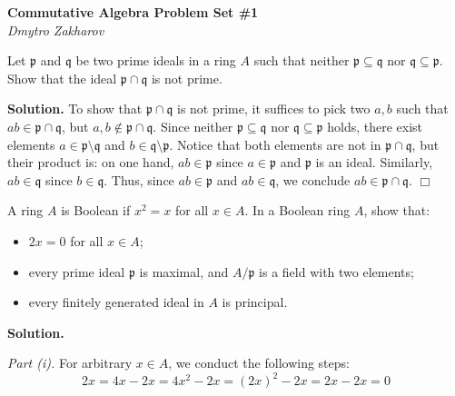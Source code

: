 \documentclass{template}
\newcommand{\qedwhite}{\hfill \ensuremath{\Box}}
\begin{document}
\begin{center}
    \Large \textcolor{blue!70!black}{\textbf{Commutative Algebra Problem Set \#1}} \\
    \normalsize \textit{Dmytro Zakharov}
\end{center}

\begin{problem}[Exercise 1]
    Let $\mathfrak{p}$ and $\mathfrak{q}$ be two prime ideals in a ring $A$ such
    that neither $\mathfrak{p} \subseteq \mathfrak{q}$ nor $\mathfrak{q}
    \subseteq \mathfrak{p}$. Show that the ideal $\mathfrak{p} \cap
    \mathfrak{q}$ is not prime.
\end{problem}

\textbf{Solution.} To show that $\mathfrak{p} \cap \mathfrak{q}$ is not prime,
it suffices to pick two $a,b$ such that $ab \in \mathfrak{p} \cap \mathfrak{q}$,
but $a,b \not\in \mathfrak{p} \cap \mathfrak{q}$. Since neither $\mathfrak{p}
\subseteq \mathfrak{q}$ nor $\mathfrak{q} \subseteq \mathfrak{p}$ holds, there
exist elements $a \in \mathfrak{p} \setminus \mathfrak{q}$ and $b \in
\mathfrak{q} \setminus \mathfrak{p}$. Notice that both elements are not in
$\mathfrak{p} \cap \mathfrak{q}$, but their product is: on one hand, $ab \in
\mathfrak{p}$ since $a \in \mathfrak{p}$ and $\mathfrak{p}$ is an ideal.
Similarly, $ab \in \mathfrak{q}$ since $b \in \mathfrak{q}$. Thus, since $ab \in
\mathfrak{p}$ and $ab \in \mathfrak{q}$, we conclude $ab \in \mathfrak{p} \cap
\mathfrak{q}$. \qedwhite

\begin{problem}[Exercise 2]
    A ring $A$ is Boolean if $x^2=x$ for all $x \in A$. In a 
    Boolean ring $A$, show that:
    \begin{itemize}
        \item[\textit{(i)}] $2x=0$ for all $x \in A$;
        \item[\textit{(ii)}] every prime ideal $\mathfrak{p}$ is 
        maximal, and $A/\mathfrak{p}$ is a field with two elements;
        \item[\textit{(iii)}] every finitely generated ideal in 
        $A$ is principal. 
    \end{itemize}
\end{problem}

\textbf{Solution.} 

\textit{Part (i).} For arbitrary $x \in A$, we conduct the following steps:
\begin{equation*}
    2x = 4x - 2x = 4x^2 - 2x = (2x)^2 - 2x = 2x - 2x = 0
\end{equation*}
\end{document}

